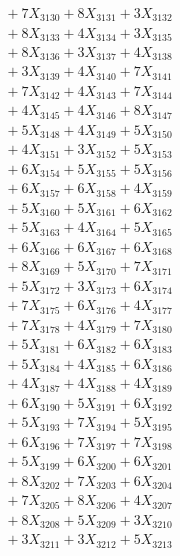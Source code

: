 \documentclass[a4paper,10pt]{article}
\begin{document}
{\begin{align}
&\;  + 7 X_{3130} + 8 X_{3131} + 3 X_{3132} \\[0.3ex]
&\;  + 8 X_{3133} + 4 X_{3134} + 3 X_{3135} \\[0.3ex]
&\;  + 8 X_{3136} + 3 X_{3137} + 4 X_{3138} \\[0.3ex]
&\;  + 3 X_{3139} + 4 X_{3140} + 7 X_{3141} \\[0.3ex]
&\;  + 7 X_{3142} + 4 X_{3143} + 7 X_{3144} \\[0.3ex]
&\;  + 4 X_{3145} + 4 X_{3146} + 8 X_{3147} \\[0.3ex]
&\;  + 5 X_{3148} + 4 X_{3149} + 5 X_{3150} \\[0.3ex]
&\;  + 4 X_{3151} + 3 X_{3152} + 5 X_{3153} \\[0.3ex]
&\;  + 6 X_{3154} + 5 X_{3155} + 5 X_{3156} \\[0.3ex]
&\;  + 6 X_{3157} + 6 X_{3158} + 4 X_{3159} \\[0.5ex]\allowbreak
&\;  + 5 X_{3160} + 5 X_{3161} + 6 X_{3162} \\[0.3ex]
&\;  + 5 X_{3163} + 4 X_{3164} + 5 X_{3165} \\[0.3ex]
&\;  + 6 X_{3166} + 6 X_{3167} + 6 X_{3168} \\[0.3ex]
&\;  + 8 X_{3169} + 5 X_{3170} + 7 X_{3171} \\[0.3ex]
&\;  + 5 X_{3172} + 3 X_{3173} + 6 X_{3174} \\[0.3ex]
&\;  + 7 X_{3175} + 6 X_{3176} + 4 X_{3177} \\[0.3ex]
&\;  + 7 X_{3178} + 4 X_{3179} + 7 X_{3180} \\[0.3ex]
&\;  + 5 X_{3181} + 6 X_{3182} + 6 X_{3183} \\[0.3ex]
&\;  + 5 X_{3184} + 4 X_{3185} + 6 X_{3186} \\[0.3ex]
&\;  + 4 X_{3187} + 4 X_{3188} + 4 X_{3189} \\[0.5ex]\allowbreak
&\;  + 6 X_{3190} + 5 X_{3191} + 6 X_{3192} \\[0.3ex]
&\;  + 5 X_{3193} + 7 X_{3194} + 5 X_{3195} \\[0.3ex]
&\;  + 6 X_{3196} + 7 X_{3197} + 7 X_{3198} \\[0.3ex]
&\;  + 5 X_{3199} + 6 X_{3200} + 6 X_{3201} \\[0.3ex]
&\;  + 8 X_{3202} + 7 X_{3203} + 6 X_{3204} \\[0.3ex]
&\;  + 7 X_{3205} + 8 X_{3206} + 4 X_{3207} \\[0.3ex]
&\;  + 8 X_{3208} + 5 X_{3209} + 3 X_{3210} \\[0.3ex]
&\;  + 3 X_{3211} + 3 X_{3212} + 5 X_{3213} \\[0.3ex]

\end{align}}
\end{document}
